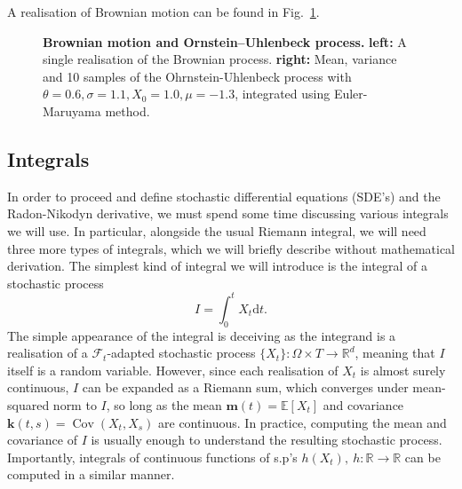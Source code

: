 A realisation of Brownian motion can be found in Fig.~\ref{fig:sp-brown}.
\begin{figure}[h]
	\centering
	\caption[Brownian motion and Ornstein–Uhlenbeck process
	]{\textbf{Brownian motion and Ornstein–Uhlenbeck process.} 
		\textbf{left:} A single realisation of the Brownian process. \textbf{right:} Mean, variance and 10 samples of the Ohrnstein-Uhlenbeck process with $\theta=0.6, \sigma=1.1, X_0=1.0, \mu=-1.3$, integrated using Euler-Maruyama method.}
	\label{fig:sp-brown}
\end{figure}

\subsection{Integrals}
In order to proceed and define stochastic differential equations (SDE's) and the Radon-Nikodyn derivative, we must spend some time discussing various integrals we will use. In particular, alongside the usual Riemann integral, we will need three more types of integrals, which we will briefly describe without mathematical derivation. The simplest kind of integral we will introduce is the integral of a stochastic process
\begin{equation}
	I = \int_{0}^{t} X_t \mathrm{d}t.
\end{equation}
The simple appearance of the integral is deceiving as the integrand is a realisation of a $\mathcal{F}_t$-adapted stochastic process $\{X_t\}: \Omega \times T \rightarrow \mathbb{R}^{d}$, meaning that $I$ itself is a random variable. However, since each realisation of $X_t$ is almost surely continuous, $I$ can be expanded as a Riemann sum, which converges under mean-squared norm to $I$, so long as the mean $\mathbf{m}(t) = \mathbb{E}[X_t]$ and covariance $\textbf{k}(t,s) = \operatorname{Cov}(X_t, X_s)$ are continuous. In practice, computing the mean and covariance of $I$ is usually enough to understand the resulting stochastic process. Importantly, integrals of continuous functions of s.p's $h(X_t),~ h: \mathbb{R} \rightarrow \mathbb{R}$ can be computed in a similar manner.


